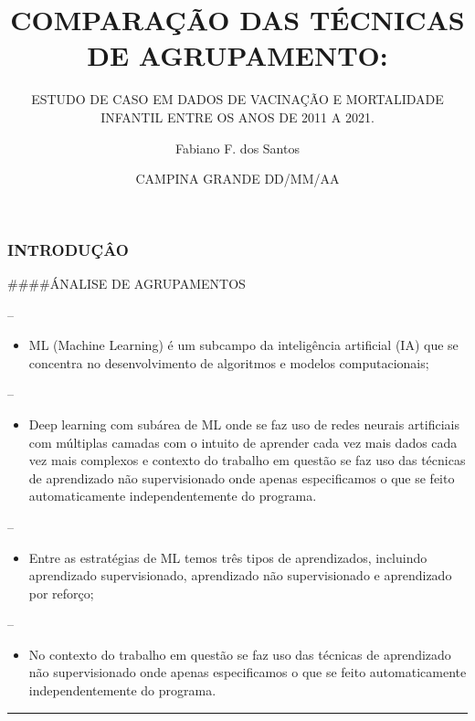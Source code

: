 \documentclass[
]{article}
\title{COMPARAÇÃO DAS TÉCNICAS DE AGRUPAMENTO:}
\subtitle{ESTUDO DE CASO EM DADOS DE VACINAÇÃO E MORTALIDADE INFANTIL
ENTRE OS ANOS DE 2011 A 2021.}
\author{Fabiano F. dos Santos}
\date{CAMPINA GRANDE DD/MM/AA}
\providecommand{\tightlist}{%
  \setlength{\itemsep}{0pt}\setlength{\parskip}{0pt}}
\begin{document}
\maketitle

\hypertarget{introduuxe7uxe2o}{%
\subsubsection{INTRODUÇÂO}\label{introduuxe7uxe2o}}

\#\#\#\#ÁNALISE DE AGRUPAMENTOS

--

\begin{itemize}
\tightlist
\item
  ML (Machine Learning) é um subcampo da inteligência artificial (IA)
  que se concentra no desenvolvimento de algoritmos e modelos
  computacionais;
\end{itemize}

--

\begin{itemize}
\tightlist
\item
  Deep learning com subárea de ML onde se faz uso de redes neurais
  artificiais com múltiplas camadas com o intuito de aprender cada vez
  mais dados cada vez mais complexos e contexto do trabalho em questão
  se faz uso das técnicas de aprendizado não supervisionado onde apenas
  especificamos o que se feito automaticamente independentemente do
  programa.
\end{itemize}

--

\begin{itemize}
\tightlist
\item
  Entre as estratégias de ML temos três tipos de aprendizados, incluindo
  aprendizado supervisionado, aprendizado não supervisionado e
  aprendizado por reforço;
\end{itemize}

--

\begin{itemize}
\tightlist
\item
  No contexto do trabalho em questão se faz uso das técnicas de
  aprendizado não supervisionado onde apenas especificamos o que se
  feito automaticamente independentemente do programa.
\end{itemize}

\begin{center}\rule{0.5\linewidth}{0.5pt}\end{center}
\end{document}

